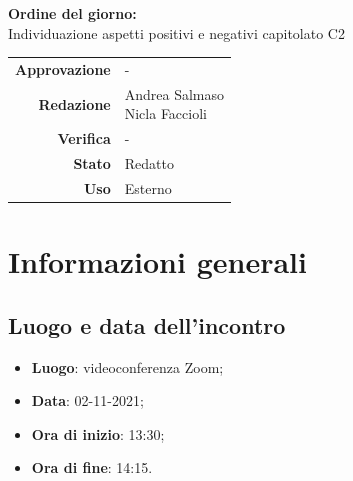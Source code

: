 \documentclass[11pt]{article}
\begin{document}
\begin{titlepage}
\begin{center}
			\large
			
			\vfill
			\textbf{Ordine del giorno:} \\
			Individuazione aspetti positivi e negativi capitolato C2
			\vfill
			
			\begin{tabular}{r|l}
				\textbf{Approvazione} &  -\\
				\textbf{Redazione} &  \parbox[t]{3.5cm}{Andrea Salmaso \\Nicla Faccioli}\\
				\textbf{Verifica} &  -\\
				\textbf{Stato} & Redatto \\
				\textbf{Uso} & Esterno
			\end{tabular}
			\vfill
			
		\end{center}
	\end{titlepage}

	\newpage

	\section{Informazioni generali}
	\subsection{Luogo e data dell'incontro}
	\begin{itemize}
		\item \textbf{Luogo}: videoconferenza Zoom;
		\item \textbf{Data}: 02-11-2021;
		\item \textbf{Ora di inizio}: 13:30;
		\item \textbf{Ora di fine}: 14:15.
	\end{itemize}
	
\end{document}
